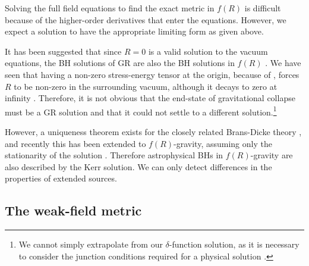 Solving the full field equations to find the exact metric in $f(R)$ is difficult because of the higher-order derivatives that enter the equations. However, we expect a solution to have the appropriate limiting form as given above.

It has been suggested that since $R = 0$ is a valid solution to the vacuum equations, the BH solutions of GR are also the BH solutions in $f(R)$ \citep{Psaltis2008, Barausse2008}. We have seen that having a non-zero stress-energy tensor at the origin, because of , forces $R$ to be non-zero in the surrounding vacuum, although it decays to zero at infinity \citep{Olmo2007c}. Therefore, it is not obvious that the end-state of gravitational collapse must be a GR solution and that it could not settle to a different solution.\footnote{We cannot simply extrapolate from our $\delta$-function solution, as it is necessary to consider the junction conditions required for a physical solution \citep{Deruelle2008}.}

However, a uniqueness theorem exists for the closely related Brans-Dicke theory \citep{Hawking1972a, Bekenstein1978, Thorne1971, Scheel1995}, and recently this has been extended to $f(R)$-gravity, assuming only the stationarity of the solution \citep{Sotiriou2011}. Therefore astrophysical BHs in $f(R)$-gravity are also described by the Kerr solution. We can only detect differences in the properties of extended sources.

\subsection{The weak-field metric}

